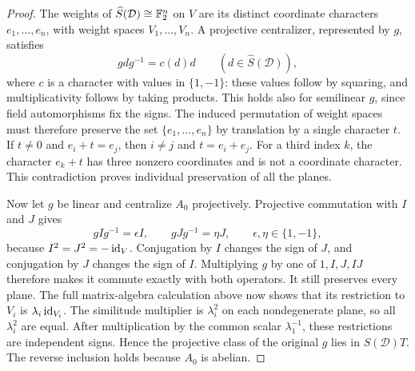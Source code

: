 \begin{proof}
The weights of $\widehat S(\mathcal D)\cong\mathbb F_2^n$ on $V$ are its
distinct coordinate characters $e_1,\ldots,e_n$, with weight spaces
$V_1,\ldots,V_n$.  A projective centralizer, represented by $g$, satisfies
\[
g d g^{-1}=c(d)d\qquad(d\in\widehat S(\mathcal D)),
\]
where $c$ is a character with values in $\{1,-1\}$: these values follow
by squaring, and multiplicativity follows by taking products.  This
holds also for semilinear $g$, since field automorphisms fix the signs.
The induced permutation of weight spaces must therefore preserve the
set $\{e_1,\ldots,e_n\}$ by translation by a single character $t$.
If $t\ne0$ and $e_i+t=e_j$, then $i\ne j$ and $t=e_i+e_j$.
For a third index $k$, the character $e_k+t$ has three nonzero
coordinates and is not a coordinate character.  This contradiction
proves individual preservation of all the planes.

Now let $g$ be linear and centralize $A_0$ projectively.  Projective
commutation with $I$ and $J$ gives
\[
gIg^{-1}=\epsilon I,\qquad gJg^{-1}=\eta J,
\qquad \epsilon,\eta\in\{1,-1\},
\]
because $I^2=J^2=-\operatorname{id}_V$.  Conjugation by $I$ changes the sign of $J$,
and conjugation by $J$ changes the sign of $I$.  Multiplying $g$ by
one of $1,I,J,IJ$ therefore makes it commute exactly with both
operators.  It still preserves every plane.  The full matrix-algebra
calculation above now shows that its restriction to $V_i$ is
$\lambda_i\operatorname{id}_{V_i}$.  The similitude multiplier is $\lambda_i^2$
on each nondegenerate plane, so all $\lambda_i^2$ are equal.
After multiplication by the common scalar $\lambda_1^{-1}$, these
restrictions are independent signs.  Hence the projective class of
the original $g$ lies in $S(\mathcal D)T$.  The reverse inclusion
holds because $A_0$ is abelian.
\end{proof}

